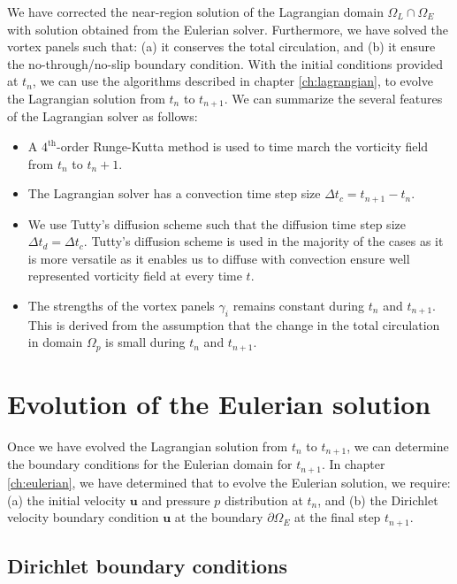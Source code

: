 We have corrected the near-region solution of the Lagrangian domain $\Omega_L \cap \Omega_E$ with solution obtained from the Eulerian solver. Furthermore, we have solved the vortex panels such that: (a) it conserves the total circulation, and (b) it ensure the no-through/no-slip boundary condition. With the initial conditions provided at $t_n$, we can use the algorithms described in chapter \ref{ch:lagrangian}, to evolve the Lagrangian solution from $t_n$ to $t_{n+1}$. We can summarize the several features of the Lagrangian solver as follows:
\begin{itemize}
\item A $4^{\mathrm{th}}$-order Runge-Kutta method is used to time march the vorticity field from $t_n$ to $t_{n}+1$.
\item The Lagrangian solver has a convection time step size $\Delta t_c = t_{n+1}-t_n$.
\item We use Tutty's diffusion scheme such that the diffusion time step size $\Delta t_d = \Delta t_c$. Tutty's diffusion scheme is used in the majority of the cases as it is more versatile as it enables us to diffuse with convection ensure well represented vorticity field at every time $t$.
\item The strengths of the vortex panels $\gamma_i$ remains constant during $t_n$ and $t_{n+1}$. This is derived from the assumption that the change in the total circulation in domain $\Omega_p$ is small during $t_n$ and $t_{n+1}$.
\end{itemize}


\section{Evolution of the Eulerian solution}

Once we have evolved the Lagrangian solution from $t_n$ to $t_{n+1}$, we can determine the boundary conditions for the Eulerian domain for $t_{n+1}$. In chapter \ref{ch:eulerian}, we have determined that to evolve the Eulerian solution, we require: (a) the initial velocity $\mathbf{u}$ and pressure $p$ distribution at $t_n$, and (b) the Dirichlet velocity boundary condition $\mathbf{u}$ at the boundary $\partial \Omega_E$ at the final step $t_{n+1}$.

\subsection{Dirichlet boundary conditions}

